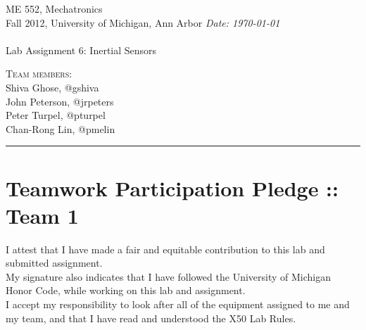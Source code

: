 \documentclass{article}
\newcommand{\shortbar}{\begin{center}\rule{5ex}{0.1pt}\end{center}}
\newcommand{\courseNumber}{ME 552}
\newcommand{\courseTitle}{Mechatronics}
\newcommand{\semester}{Fall 2012}
\theoremstyle{plain}
\theoremstyle{definition}
\theoremstyle{remark}
\newenvironment{solution}[1]{\medskip\noindent{\bf Problem #1.~}}{\shortbar}
\newcommand{\solutions}[4]{
\vspace{-2ex}
\begin{center}
{\small  \courseNumber, \courseTitle
\hfill {\Large \bf {#1} }\\
\semester, University of Michigan, Ann Arbor \hfill
{\em Date: #3}}\\
\vspace{-1ex}
\hrulefill\\
\vspace{4ex}
{\LARGE Lab Assignment #2}\\
\vspace{2ex}
\end{center}
\begin{trivlist}
\item \textsc{Team members:\\} {#4}
\end{trivlist}
\noindent
\shortbar
\vspace{3ex}
}
\begin{document}
\solutions{}{6: Inertial Sensors}{\today}{Shiva Ghose, @gshiva\\ John Peterson, @jrpeters\\ Peter Turpel, @pturpel\\ Chan-Rong Lin, @pmelin}
%
%
\section*{Teamwork Participation Pledge :: Team 1}

I attest that I have made a fair and equitable contribution to this lab and submitted 
assignment. \\

My signature also indicates that I have followed the University of Michigan Honor Code, 
while working on this lab and assignment.\\

I accept my responsibility to look after all of the equipment assigned to me and my team, 
and that I have read and understood the X50 Lab Rules.\\
\end{document}
